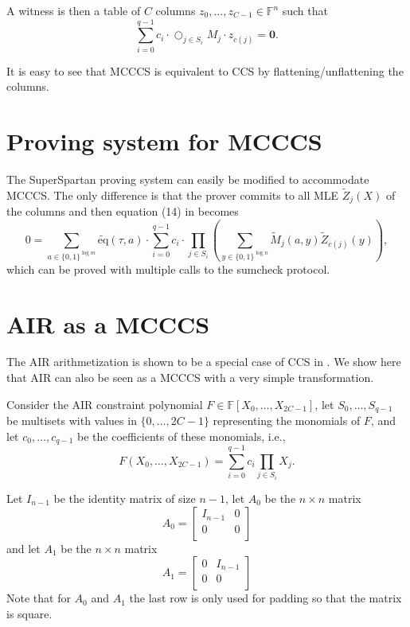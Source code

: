 \documentclass[a4paper]{article}
\begin{document}
A witness is then a table of $C$ columns $z_0,\dots,z_{C-1}\in \mathbb{F}^n$ such that 
$$
\sum_{i=0}^{q-1} c_i \cdot \bigcirc_{j\in S_i} M_j \cdot z_{c(j)} = \mathbf{0}.
$$

It is easy to see that MCCCS is equivalent to CCS by flattening/unflattening the columns. 

\section*{Proving system for MCCCS}
The SuperSpartan proving system can easily be modified to accommodate MCCCS. The only difference is that the prover commits to all MLE $\widetilde{Z}_j(X)$ of the columns and then equation (14) in \cite{cryptoeprint:2023/552}  becomes
$$
0 = \sum_{a\in \{0,1\}^{\log m}} \widetilde{\text{eq}}(\tau, a)\cdot \sum_{i=0}^{q-1}c_i\cdot \prod_{j\in S_i}\left(\sum_{y\in \{0,1\}^{\log n}} \widetilde{M}_{j}(a,y)\widetilde{Z}_{c(j)}(y)\right),
$$
which can be proved with multiple calls to the sumcheck protocol.

\section*{AIR as a MCCCS}
The AIR arithmetization is shown to be a special case of CCS in \cite{cryptoeprint:2023/552}. We show here that AIR can also be seen as a MCCCS with a very simple transformation.

Consider the AIR constraint polynomial $F \in \mathbb{F}[X_0,\dots,X_{2C-1}]$, let $S_0,\dots,S_{q-1}$ be multisets with values in $\{0,\dots,2C-1\}$ representing the monomials of $F$, and let $c_0,\dots,c_{q-1}$ be the coefficients of these monomials, i.e., 
$$
F(X_0,\dots,X_{2C-1}) = \sum_{i=0}^{q-1} c_i \prod_{j\in S_i}X_j.
$$

Let $I_{n-1}$ be the identity matrix of size $n-1$, let $A_0$ be the 
$n\times n$ matrix
$$ A_0 = 
\begin{bmatrix}
I_{n-1} & 0 \\
0 & 0      \\
\end{bmatrix}
$$
and let $A_1$ be the $n\times n$ matrix
$$
A_1 = 
\begin{bmatrix}
0 & I_{n-1} \\
0 & 0      \\
\end{bmatrix}
$$
Note that for $A_0$ and $A_1$ the last row is only used for padding so that the matrix is square. 
\end{document}
